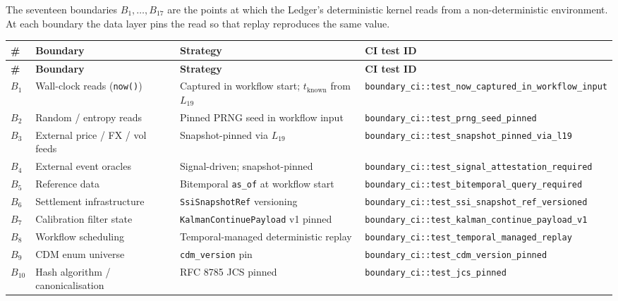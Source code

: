 \documentclass[11pt,a4paper]{article}
\begin{document}
The seventeen boundaries $B_1, \dots, B_{17}$ are the points at which the Ledger's deterministic kernel reads from a non-deterministic environment. At each boundary the data layer pins the read so that replay reproduces the same value.

\begin{center}
\renewcommand{\arraystretch}{1.15}
\begin{longtable}{@{}p{0.8cm}p{4.5cm}p{5.5cm}p{5.0cm}@{}}
\toprule
\textbf{\#} & \textbf{Boundary} & \textbf{Strategy} & \textbf{CI test ID} \\
\midrule
\endfirsthead
\toprule
\textbf{\#} & \textbf{Boundary} & \textbf{Strategy} & \textbf{CI test ID} \\
\midrule
\endhead
\bottomrule
\endfoot
$B_1$  & Wall-clock reads (\texttt{now()})       & Captured in workflow start; $t_{\mathrm{known}}$ from $L_{19}$ & \texttt{boundary\_ci::test\_now\_captured\_in\_workflow\_input} \\
$B_2$  & Random / entropy reads                  & Pinned PRNG seed in workflow input            & \texttt{boundary\_ci::test\_prng\_seed\_pinned} \\
$B_3$  & External price / FX / vol feeds         & Snapshot-pinned via $L_{19}$                  & \texttt{boundary\_ci::test\_snapshot\_pinned\_via\_l19} \\
$B_4$  & External event oracles                  & Signal-driven; snapshot-pinned                & \texttt{boundary\_ci::test\_signal\_attestation\_required} \\
$B_5$  & Reference data                          & Bitemporal \texttt{as\_of} at workflow start  & \texttt{boundary\_ci::test\_bitemporal\_query\_required} \\
$B_6$  & Settlement infrastructure               & \texttt{SsiSnapshotRef} versioning            & \texttt{boundary\_ci::test\_ssi\_snapshot\_ref\_versioned} \\
$B_7$  & Calibration filter state                & \texttt{KalmanContinuePayload} v1 pinned      & \texttt{boundary\_ci::test\_kalman\_continue\_payload\_v1} \\
$B_8$  & Workflow scheduling                     & Temporal-managed deterministic replay         & \texttt{boundary\_ci::test\_temporal\_managed\_replay} \\
$B_9$  & CDM enum universe                       & \texttt{cdm\_version} pin                     & \texttt{boundary\_ci::test\_cdm\_version\_pinned} \\
$B_{10}$ & Hash algorithm / canonicalisation     & RFC 8785 JCS pinned                            & \texttt{boundary\_ci::test\_jcs\_pinned} \\

\end{longtable}
\end{center}
\end{document}
